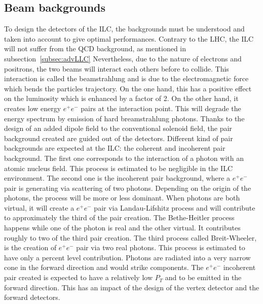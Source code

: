     \subsection{Beam backgrounds}

    To design the detectors of the \gls{ILC}, the backgrounds must be understood and taken into account to give optimal performances.
    Contrary to the \gls{LHC}, the \gls{ILC} will not suffer from the QCD background, as mentioned in subsection~\ref{subsec:advLLC}
    Nevertheless, due to the nature of electrons and positrons, the two beams will interact each others before to collide.
    This interaction is called the beamstrahlung and is due to the electromagnetic force which bends the particles trajectory.
    On the one hand, this has a positive effect on the luminosity which is enhanced by a factor of 2.
    On the other hand, it creates low energy $e^+e^-$ pairs at the interaction point. 
    This will degrade the energy spectrum by emission of hard breamstrahlung photons.
    Thanks to the design of an added dipole field to the conventional solenoid field, the pair background created are guided out of the detectors. 
    Different kind of pair backgrounds are expected at the \gls{ILC}: the coherent and incoherent pair background.
    The first one corresponds to the interaction of a photon with an atomic nucleus field.
    This process is estimated to be negligible in the \gls{ILC} environment.
    The second one is the incoherent pair background, where a $e^+e^-$ pair is generating via scattering of two photons.
    Depending on the origin of the photons, the process will be more or less dominant.
    When photons are both virtual, it will create a $e^+e^-$ pair via Landau-Lifshitz process and will contribute to approximately the third of the pair creation.
    The Bethe-Heitler process happens while one of the photon is real and the other virtual. 
    It contributes roughly to two of the third pair creation.
    The third process called Breit-Wheeler, is the creation of $e^+e^-$ pair via two real photons.
    This process is estimated to have only a percent level contribution.
    Photons are radiated into a very narrow cone in the forward direction and would strike components.
    The $e^+e^-$ incoherent pair created is expected to have a relatively low $P_T$ and to be emitted in the forward direction.
    This has an impact of the design of the vertex detector and the forward detectors.

    
